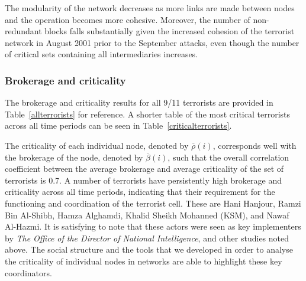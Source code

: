 The modularity of the network decreases as more links are made between nodes and the operation becomes more cohesive. Moreover, the number of non-redundant blocks falls substantially given the increased cohesion of the terrorist network in August 2001 prior to the September attacks, even though the number of critical sets containing all intermediaries increases.

\subsubsection*{Brokerage and criticality}

The brokerage and criticality results for all 9/11 terrorists are provided in Table~\ref{allterrorists} for reference. A shorter table of the most critical terrorists across all time periods can be seen in Table~\ref{criticalterrorists}.

The criticality of each individual node, denoted by $\overline{\rho}(i)$, corresponds well with the brokerage of the node, denoted by $\overline{\beta}(i)$, such that the overall correlation coefficient between the average brokerage and average criticality of the set of terrorists is 0.7. A number of terrorists have persistently high brokerage and criticality across all time periods, indicating that their requirement for the functioning and coordination of the terrorist cell. These are Hani Hanjour, Ramzi Bin Al-Shibh, Hamza Alghamdi, Khalid Sheikh Mohanned (KSM), and Nawaf Al-Hazmi. It is satisfying to note that these actors were seen as key implementers by \emph{The Office of the Director of National Intelligence}, and other studies noted above. The social structure and the tools that we developed in order to analyse the criticality of individual nodes in networks are able to highlight these key coordinators.

